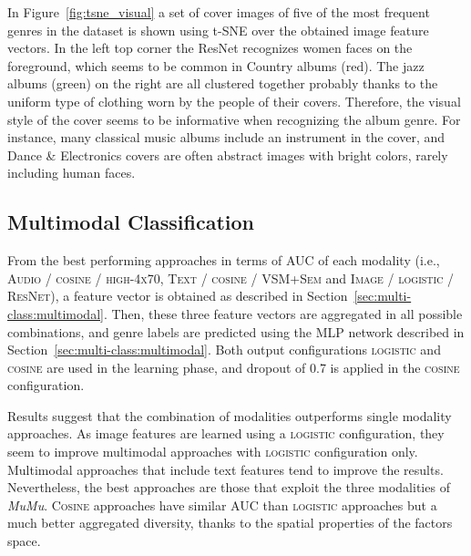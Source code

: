 In Figure~\ref{fig:tsne_visual} a set of cover images of five of the most frequent genres in the dataset is shown using t-SNE over the obtained image feature vectors. 
In the left top corner the ResNet recognizes women faces on the foreground, which seems to be common in Country albums (red).
The jazz albums (green) on the right are all clustered together probably thanks to the uniform type of clothing worn by the people of their covers. 
Therefore, the visual style of the cover seems to be informative when recognizing the album genre.
For instance, many classical music albums include an instrument in the cover, and Dance \& Electronics covers are often abstract images with bright colors, rarely including human faces.

\subsection{Multimodal Classification}\label{sec:multi-class:multiexp}

From the best performing approaches in terms of AUC of each modality (i.e., \textsc{Audio} / \textsc{cosine} / \textsc{high-4x70}, \textsc{Text} / \textsc{cosine} / \textsc{VSM+Sem} and \textsc{Image} / \textsc{logistic} / \textsc{ResNet}), a feature vector is obtained as described in Section~\ref{sec:multi-class:multimodal}. 
Then, these three feature vectors are aggregated in all possible combinations, and genre labels are predicted using the MLP network described in Section~\ref{sec:multi-class:multimodal}.
Both output configurations \textsc{logistic} and \textsc{cosine} are used in the learning phase, and dropout of 0.7 is applied in the \textsc{cosine} configuration.

Results suggest that the combination of modalities outperforms single modality approaches. 
As image features are learned using a \textsc{logistic} configuration, they seem to improve multimodal approaches with \textsc{logistic} configuration only. 
Multimodal approaches that include text features tend to improve the results. %
Nevertheless, the best approaches are those that exploit the three modalities of \emph{MuMu}. \textsc{Cosine} approaches have similar AUC than \textsc{logistic} approaches but a much better aggregated diversity, thanks to the spatial properties of the factors space. 


